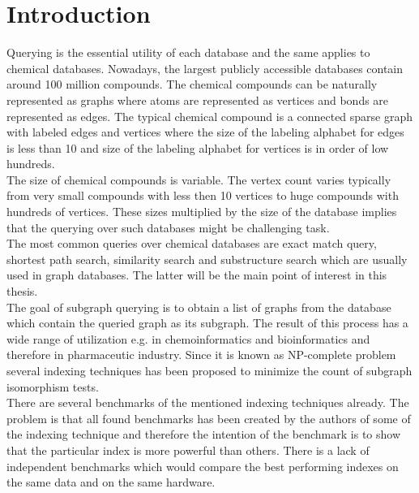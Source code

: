 \chapter*{Introduction}

Querying is the essential utility of each database and the same applies to chemical databases. Nowadays, the largest publicly accessible databases contain around 100 million compounds. The chemical compounds can be naturally represented as graphs where atoms are represented as vertices and bonds are represented as edges. The typical chemical compound is a connected sparse graph with labeled edges and vertices where the size of the labeling alphabet for edges is less than 10 and size of the labeling alphabet for vertices is in order of low hundreds.\\

The size of chemical compounds is variable. The vertex count varies typically from very small compounds with less then 10 vertices to huge compounds with hundreds of vertices. These sizes multiplied by the size of the database implies that the querying over such databases might be challenging task.\\

The most common queries over chemical databases are exact match query, shortest path search, similarity search and substructure search which are usually used in graph databases. The latter will be the main point of interest in this thesis.\\

The goal of subgraph querying is to obtain a list of graphs from the database which contain the queried graph as its subgraph. The result of this process has a wide range of utilization e.g. in chemoinformatics and bioinformatics and therefore in pharmaceutic industry. Since it is known as NP-complete problem several indexing techniques has been proposed to minimize the count of subgraph isomorphism tests.\\

There are several benchmarks of the mentioned indexing techniques already. The problem is that all found benchmarks has been created by the authors of some of the indexing technique and therefore the intention of the benchmark is to show that the particular index is more powerful than others. There is a lack of independent benchmarks which would compare the best performing indexes on the same data and on the same hardware.\\  

